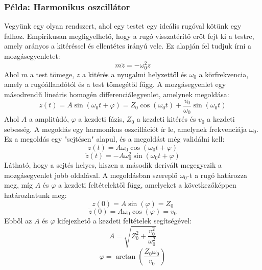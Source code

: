 \documentclass[../main.tex]{subfiles}
\begin{document}
\subsubsection*{Példa: Harmonikus oszcillátor}
Vegyünk egy olyan rendszert, ahol egy testet egy ideális rugóval kötünk egy falhoz. Empirikusan megfigyelhető, hogy a rugó visszatérítő erőt fejt ki a testre, amely arányos a kitéréssel és ellentétes irányú vele. 
Ez alapján fel tudjuk írni a mozgásegyenletet:
\begin{equation}
    m\ddot{z} = -\omega_0^2 z
\end{equation}
Ahol $m$ a test tömege, $z$ a kitérés a nyugalmi helyzettől és $\omega_0$ a körfrekvencia, amely a rugóállandótól és a test tömegétől függ. A mozgásegyenlet egy másodrendű lineáris homogén differenciálegyenlet, amelynek megoldása: 
\begin{equation}
    z(t) = A \sin(\omega_0 t + \varphi) = Z_0\cos(\omega_0 t) + \frac{v_0}{\omega_0}\sin(\omega_0 t)
\end{equation}
Ahol $A$ a amplitúdó, $\varphi$ a kezdeti fázis, $Z_0$ a kezdeti kitérés és $v_0$ a kezdeti sebesség. A megoldás egy harmonikus oszcillációt ír le, amelynek frekvenciája $\omega_0$. Ez a megoldás egy "sejtésen" alapul, 
és a megoldást még validálni kell:
\begin{equation}
    \dot{z}(t) = A\omega_0 \cos(\omega_0 t + \varphi)
\end{equation}
\begin{equation}
    \ddot{z}(t) = -A\omega_0^2 \sin(\omega_0 t + \varphi)
\end{equation}
Látható, hogy a sejtés helyes, hiszen a második derivált megegyezik a mozgásegyenlet jobb oldalával. A megoldásban szereplő $\omega_0$-t a rugó határozza meg, míg $A$ és $\varphi$ a kezdeti feltételektől függ, amelyeket a következőképpen határozhatunk meg:
\begin{equation}
    z(0) = A \sin(\varphi) = Z_0
\end{equation}
\begin{equation}
    \dot{z}(0) = A\omega_0 \cos(\varphi) = v_0
\end{equation}
Ebből az $A$ és $\varphi$ kifejezhető a kezdeti feltételek segítségével:
\begin{equation}
    A = \sqrt{Z_0^2 + \frac{v_0^2}{\omega_0^2}}
\end{equation}
\begin{equation}
    \varphi = \arctan\left(\frac{Z_0 \omega_0}{v_0}\right)
\end{equation}
\end{document}
